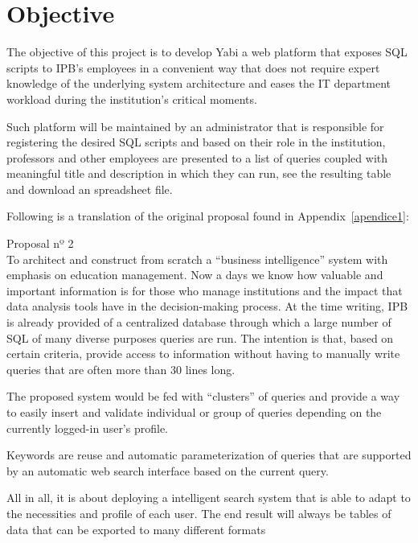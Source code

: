 \section{Objective}\label{objective}

The objective of this project is to develop \gls{Yabi} a web platform that exposes \gls{SQL} scripts to \gls{IPB}'s employees in a convenient way that does not require expert knowledge of the underlying system architecture and eases the \gls{IT} department workload during the institution's critical moments.

Such platform will be maintained by an administrator that is responsible for registering the desired \gls{SQL} scripts and based on their role in the institution, professors and other employees are presented to a list of queries coupled with meaningful title and description in which they can run, see the resulting table and download an spreadsheet file.

Following is a translation of the original proposal found in Appendix~\ref{apendice1}:

\begin{displayquote}
  Proposal nº 2\\
  To architect and construct from scratch a ``business intelligence'' system with emphasis on education management.
  Now a days we know how valuable and important information is for those who manage institutions and the impact that data analysis tools have in the decision-making process.
  At the time writing, \gls{IPB} is already provided of a centralized database through which a large number of \gls{SQL} of many diverse purposes queries are run.
  The intention is that, based on certain criteria, provide access to information without having to manually write queries that are often more than 30 lines long.

  The proposed system would be fed with ``clusters'' of queries and provide a way to easily insert and validate individual or group of queries depending on the currently logged-in user's profile.

  Keywords are reuse and automatic parameterization of queries that are supported by an automatic web search interface based on the current query.

  All in all, it is about deploying a intelligent search system that is able to adapt to the necessities and profile of each user. The end result will always be tables of data that can be exported to many different formats
\end{displayquote}

